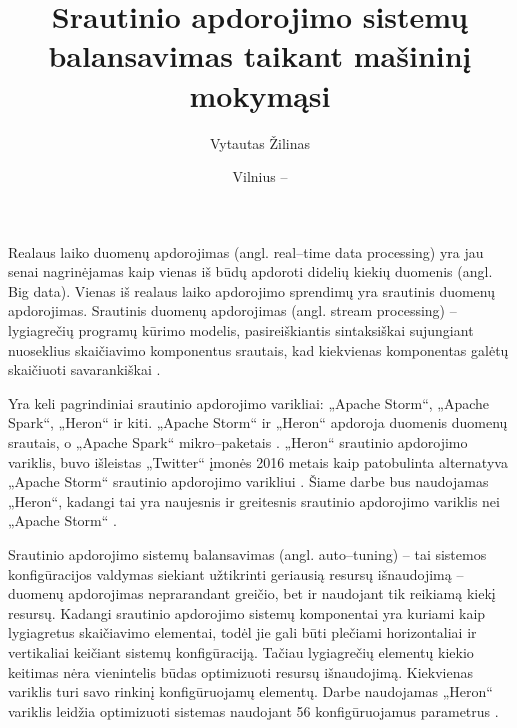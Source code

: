 \documentclass{VUMIFPSbakalaurinis}
\title{Srautinio apdorojimo sistemų balansavimas taikant mašininį mokymąsi}
\author{Vytautas Žilinas}
\date{Vilnius – \the\year}
\begin{document}
 
\maketitle

\cleardoublepage{}
\setcounter{page}{2}

\tableofcontents


Realaus laiko duomenų apdorojimas (angl. real–time data processing) yra jau senai nagrinėjamas kaip vienas iš būdų apdoroti didelių kiekių duomenis (angl. Big data). Vienas iš realaus laiko apdorojimo sprendimų yra srautinis duomenų apdorojimas. Srautinis duomenų apdorojimas (angl. stream processing) – lygiagrečių programų kūrimo modelis, pasireiškiantis sintaksiškai sujungiant nuoseklius skaičiavimo komponentus srautais, kad kiekvienas komponentas galėtų skaičiuoti savarankiškai \cite{shortstreamproc}. 

Yra keli pagrindiniai srautinio apdorojimo varikliai: „Apache Storm“, „Apache Spark“, „Heron“ ir kiti. „Apache Storm“ ir „Heron“ apdoroja duomenis duomenų srautais, o „Apache Spark“ mikro–paketais \cite{karau2015learning}. „Heron“ srautinio apdorojimo variklis, buvo išleistas „Twitter“ įmonės 2016 metais kaip patobulinta alternatyva „Apache Storm“ srautinio apdorojimo varikliui \cite{openSourcing}. Šiame darbe bus naudojamas „Heron“, kadangi tai yra naujesnis ir greitesnis srautinio apdorojimo variklis nei „Apache Storm“ \cite{twitterHeron}. 

Srautinio apdorojimo sistemų balansavimas (angl. auto–tuning) – tai sistemos konfigūracijos valdymas siekiant užtikrinti geriausią resursų išnaudojimą – duomenų apdorojimas neprarandant greičio, bet ir naudojant tik reikiamą kiekį resursų. Kadangi srautinio apdorojimo sistemų komponentai yra kuriami kaip lygiagretus skaičiavimo elementai, todėl jie gali būti plečiami horizontaliai ir vertikaliai \cite{shortstreamproc} keičiant sistemų konfigūraciją. Tačiau lygiagrečių elementų kiekio keitimas nėra vienintelis būdas optimizuoti resursų išnaudojimą. Kiekvienas variklis turi savo rinkinį konfigūruojamų elementų. Darbe naudojamas „Heron“ variklis leidžia optimizuoti sistemas naudojant 56 konfigūruojamus parametrus \cite{configDocument}.
\end{document}
